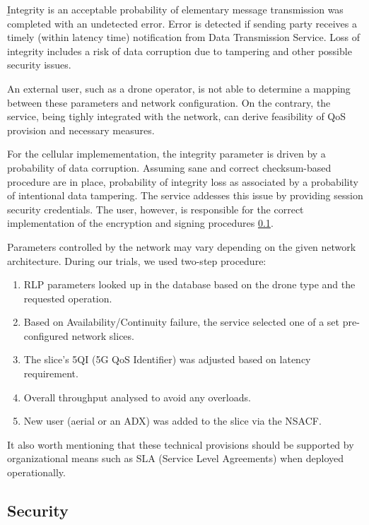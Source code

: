 \documentclass[a4paper,conference]{IEEEtran}
\begin{document}
{\b Integrity} is an acceptable probability of elementary message transmission was completed with an undetected error. Error is detected if sending party receives a timely (within latency time) notification from Data Transmission Service. Loss of integrity includes a risk of data corruption due to tampering and other possible security issues.

An external user, such as a drone operator, is not able to determine a mapping between these parameters and network configuration. On the contrary, the service, being tighly integrated with the network, can derive feasibility of QoS provision and necessary measures.

For the cellular implemementation, the integrity parameter is driven by a probability of data corruption. Assuming sane and correct checksum-based procedure are in place, probability of integrity loss as associated by a probability of intentional data tampering. The service addesses this issue by providing session security credentials. The user, however, is responsible for the correct implementation of the encryption and signing procedures \ref{security}.

Parameters controlled by the network may vary depending on the given network architecture. During our trials, we used two-step procedure:

\begin{enumerate}
\item RLP parameters looked up in the database based on the drone type and the requested operation.
\item Based on Availability/Continuity failure, the service selected one of a set pre-configured network slices.
\item The slice's 5QI (5G QoS Identifier) was adjusted based on latency requirement.
\item Overall throughput analysed to avoid any overloads.
\item New user (aerial or an ADX) was added to the slice via the NSACF.
\end{enumerate}

It also worth mentioning that these technical provisions should be supported by organizational means such as SLA (Service Level Agreements) when deployed operationally.

\subsection{Security}
\label{security}
\end{document}
